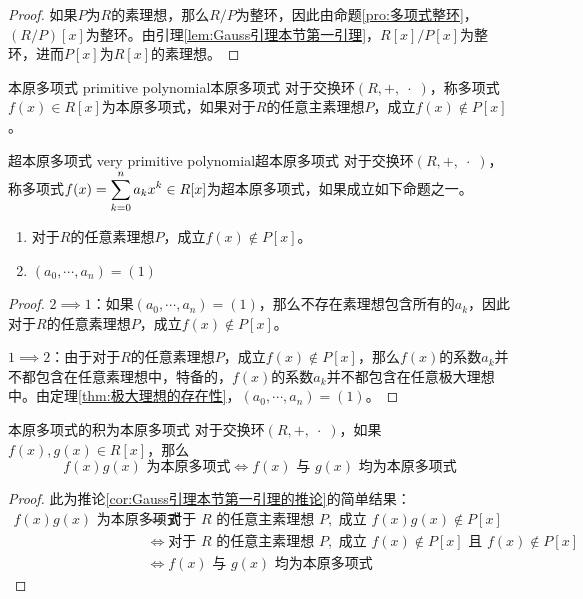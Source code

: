 \begin{proof}
	如果$P$为$R$的素理想，那么$R/P$为整环，因此由命题\ref{pro:多项式整环}，$(R/P)[x]$为整环。由引理\ref{lem:Gauss引理本节第一引理}，$R[x]/P[x]$为整环，进而$P[x]$为$R[x]$的素理想。
\end{proof}

\begin{definition}{本原多项式 primitive polynomial}{本原多项式}
	对于交换环$(R,+,\;\cdot \;)$，称多项式$f(x)\in R[x]$为本原多项式，如果对于$R$的任意主素理想$P$，成立$f(x)\notin P[x]$。
\end{definition}

\begin{definition}{超本原多项式 very primitive polynomial}{超本原多项式}
	对于交换环$(R,+,\;\cdot \;)$，称多项式$\displaystyle f(x)=\sum_{k=0}^{n}a_kx^k\in R[x]$为超本原多项式，如果成立如下命题之一。
	\begin{enumerate}
		\item 对于$R$的任意素理想$P$，成立$f(x)\notin P[x]$。
		\item $(a_0,\cdots,a_n)=(1)$
	\end{enumerate}
\end{definition}

\begin{proof}
	$2\implies 1$：如果$(a_0,\cdots,a_n)=(1)$，那么不存在素理想包含所有的$a_k$，因此对于$R$的任意素理想$P$，成立$f(x)\notin P[x]$。
	
	$1\implies 2$：由于对于$R$的任意素理想$P$，成立$f(x)\notin P[x]$，那么$f(x)$的系数$a_k$并不都包含在任意素理想中，特备的，$f(x)$的系数$a_k$并不都包含在任意极大理想中。由定理\ref{thm:极大理想的存在性}，$(a_0,\cdots,a_n)=(1)$。
\end{proof}

\begin{lemma}{}{本原多项式的积为本原多项式}
	对于交换环$(R,+,\;\cdot \;)$，如果$f(x),g(x)\in R[x]$，那么%
	$$
	f(x)g(x)\text{ 为本原多项式}
	\iff
	f(x)\text{ 与 }g(x)\text{ 均为本原多项式}
	$$
\end{lemma}

\begin{proof}
	此为推论\ref{cor:Gauss引理本节第一引理的推论}的简单结果：
	\begin{align*}
		f(x)g(x)\text{ 为本原多项式}
		& \iff \text{对于 }R\text{ 的任意主素理想 }P,\text{ 成立 }f(x)g(x)\notin P[x]\\
		& \iff \text{对于 }R\text{ 的任意主素理想 }P,\text{ 成立 }f(x)\notin P[x]\text{ 且 }f(x)\notin P[x]\\
		& \iff f(x)\text{ 与 }g(x)\text{ 均为本原多项式}
	\end{align*}
\end{proof}

